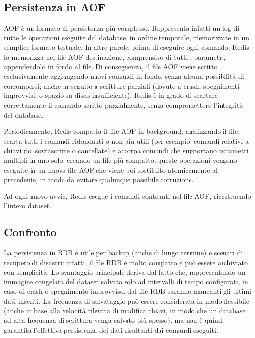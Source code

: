 \subsection{Persistenza in AOF}

AOF è un formato di persistenza più complesso. Rappresenta infatti un log di tutte le operazioni
eseguite dal database, in ordine temporale, memorizzate in un semplice formato testuale. In altre
parole, prima di eseguire ogni comando, Redis lo memorizza nel file AOF destinazione, comprensivo di
tutti i parametri, appendendolo in fondo al file. Di conseguenza, il file AOF viene scritto
esclusivamente aggiungendo nuovi comandi in fondo, senza alcuna possibilità di corrompersi; anche in
seguito a scritture parziali (dovute a crash, spegnimenti improvvisi, o spazio su disco
insufficiente), Redis è in grado di scartare correttamente il comando scritto parzialmente, senza
compromettere l'integrità del database.

Periodicamente, Redis compatta il file AOF in background; analizzando il file, scarta tutti i
comandi ridondanti o non più utili (per esempio, comandi relativi a chiavi poi sovrascritte o
cancellate) e accorpa comandi che supportano parametri multipli in uno solo, creando un file più
compatto; queste operazioni vengono eseguite in un nuovo file AOF che viene poi sostituito
atomicamente al precedente, in modo da evitare qualunque possibile corruzione.

Ad ogni nuovo avvio, Redis esegue i comandi contenuti nel file AOF, ricostruendo l'intero dataset.


\subsection{Confronto}

La persistenza in RDB è utile per backup (anche di lungo termine) e scenari di recupero di
disastri: infatti, il file RDB è molto compatto e può essere archiviato con semplicità. Lo
svantaggio principale deriva dal fatto che, rappresentando un immagine congelata del dataset
salvato solo ad intervalli di tempo configurati, in caso di crash o spegnimento improvviso,
dal file RDB saranno mancanti gli ultimi dati inseriti. La frequenza di salvataggio può essere
considerata in modo flessibile (anche in base alla velocità rilevata di modifica chiavi, in modo
che un database ad alta frequenza di scrittura venga salvato più spesso), ma non è quindi
garantita l'effettiva persistenza dei dati risultanti dai comandi eseguiti.

